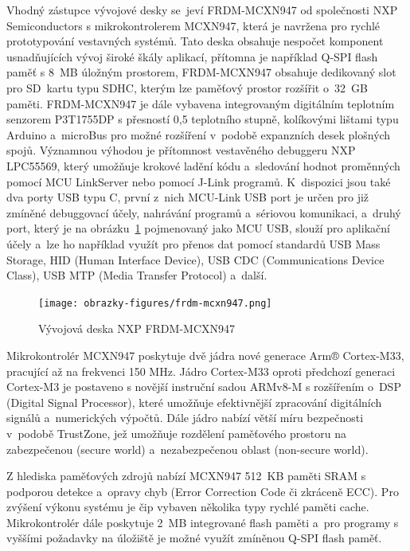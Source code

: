 Vhodný zástupce vývojové desky se~jeví FRDM-MCXN947 od společnosti NXP Semiconductors s mikrokontrolerem MCXN947, která je navržena pro rychlé prototypování vestavných systémů. Tato deska obsahuje nespočet komponent usnadňujících vývoj široké škály aplikací, přítomna je například Q-SPI flash paměť s 8~MB úložným prostorem, FRDM-MCXN947 obsahuje dedikovaný slot pro SD~kartu typu SDHC, kterým lze paměťový prostor rozšířit o~32~GB paměti. FRDM-MCXN947 je dále vybavena integrovaným digitálním teplotním senzorem P3T1755DP s přesností 0,5 teplotního stupně, kolíkovými lištami typu Arduino a~microBus pro možné rozšíření v~podobě expanzních desek plošných spojů. Významnou výhodou je přítomnost vestavěného debuggeru NXP LPC55569, který umožňuje krokové ladění kódu a~sledování hodnot proměnných pomocí MCU LinkServer nebo pomocí J-Link programů. K~dispozici jsou také dva porty USB typu C, první z~nich MCU-Link USB port je určen pro již zmíněné debuggovací účely, nahrávání programů a~sériovou komunikaci, a~druhý port, který je na obrázku~\ref{fig:frdm-mcxn947} pojmenovaný jako MCU USB, slouží pro aplikační účely a~lze ho například využít pro přenos dat pomocí standardů USB Mass Storage, HID (Human Interface Device), USB CDC (Communications Device Class), USB MTP (Media Transfer Protocol) a~další.~\cite{nxp_FRDM_MCXN947_getting_started, nxp_MCX_Nx4x_Reference_Manual}

\begin{figure}[h]
    \centering
    \texttt{[image: obrazky-figures/frdm-mcxn947.png]}
    
    \caption{Vývojová deska NXP FRDM-MCXN947~\cite{nxp_FRDM_MCXN947_getting_started}}
    \label{fig:frdm-mcxn947}
\end{figure}

Mikrokontrolér MCXN947 poskytuje dvě jádra nové generace Arm® Cortex-M33, pracující až na frekvenci 150 MHz. Jádro Cortex-M33 oproti předchozí generaci Cortex-M3 je postaveno s novější instruční sadou ARMv8-M s rozšířením o~DSP (Digital Signal Processor), které umožňuje efektivnější zpracování digitálních signálů a~numerických výpočtů. Dále jádro nabízí větší míru bezpečnosti v~podobě TrustZone, jež umožňuje rozdělení paměťového prostoru na zabezpečenou (secure world) a~nezabezpečenou oblast (non-secure world).~\cite{nxp_MCX_Nx4x_Reference_Manual}

Z hlediska paměťových zdrojů nabízí MCXN947 512~KB paměti SRAM s podporou detekce a~opravy chyb (Error Correction Code či zkráceně ECC). Pro zvýšení výkonu systému je čip vybaven několika typy rychlé paměti cache. Mikrokontrolér dále poskytuje 2~MB integrované flash paměti a~pro programy s vyššími požadavky na úložiště je možné využít zmíněnou Q-SPI flash paměť.~\cite{nxp_MCX_Nx4x_Reference_Manual}

